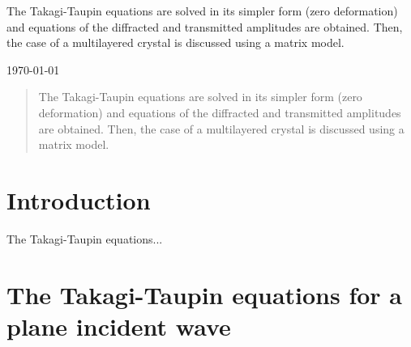 \documentclass[preprint]{iucr}              %
\begin{document}
\maketitle                        %

\begin{synopsis}
The Takagi-Taupin equations are solved in its simpler form (zero deformation) and equations of the diffracted and transmitted amplitudes are obtained. Then, the case of a multilayered crystal is discussed using a matrix model. 
\end{synopsis}

\today

\begin{abstract}

The Takagi-Taupin equations are solved in its simpler form (zero deformation) and equations of the diffracted and transmitted amplitudes are obtained. Then, the case of a multilayered crystal is discussed using a matrix model. 

\end{abstract}



\section{Introduction}

The Takagi-Taupin \cite{Takagi1962, Taupin, Taupin1967} equations...

%
\section{The Takagi-Taupin equations for a plane incident wave}
\label{sec:TT}
\end{document}
